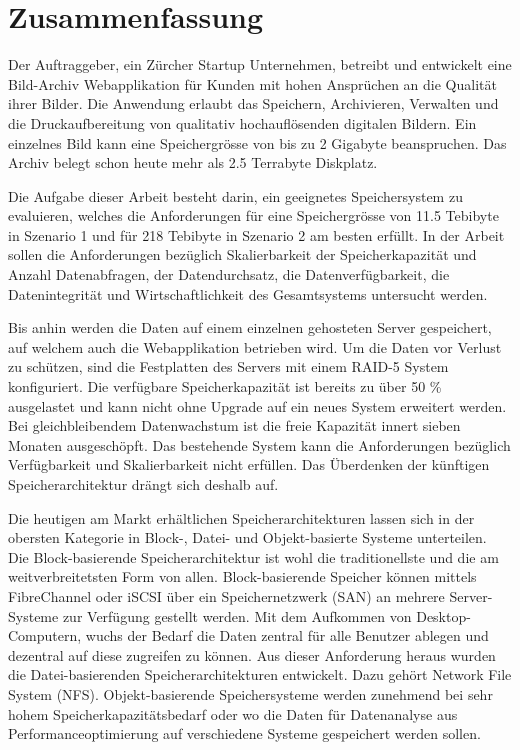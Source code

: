 \cleardoublepage
\chapter{Zusammenfassung}

Der Auftraggeber, ein Zürcher Startup Unternehmen, betreibt und entwickelt eine Bild-Archiv Webapplikation für Kunden mit hohen Ansprüchen an die Qualität ihrer Bilder. Die Anwendung erlaubt das Speichern, Archivieren, Verwalten und die Druckaufbereitung von qualitativ hochauflösenden digitalen Bildern. Ein einzelnes Bild kann eine Speichergrösse von bis zu 2 Gigabyte beanspruchen. Das Archiv belegt schon heute mehr als 2.5 Terrabyte Diskplatz.

Die Aufgabe dieser Arbeit besteht darin, ein geeignetes Speichersystem zu evaluieren, welches die Anforderungen für eine Speichergrösse von 11.5 Tebibyte in Szenario 1 und für 218 Tebibyte in Szenario 2 am besten erfüllt. In der Arbeit sollen die Anforderungen bezüglich Skalierbarkeit der Speicherkapazität und Anzahl Datenabfragen, der Datendurchsatz, die Datenverfügbarkeit, die Datenintegrität und Wirtschaftlichkeit des Gesamtsystems untersucht werden.

Bis anhin werden die Daten auf einem einzelnen gehosteten Server gespeichert, auf welchem auch die Webapplikation betrieben wird. Um die Daten vor Verlust zu schützen, sind die Festplatten des Servers mit einem RAID-5 System konfiguriert. Die verfügbare Speicherkapazität ist bereits zu über 50 \% ausgelastet und kann nicht ohne Upgrade auf ein neues System erweitert werden. Bei gleichbleibendem Datenwachstum ist die freie Kapazität innert sieben Monaten ausgeschöpft. Das bestehende System kann die Anforderungen bezüglich Verfügbarkeit und Skalierbarkeit nicht erfüllen. Das Überdenken der künftigen Speicherarchitektur drängt sich deshalb auf.
 
Die heutigen am Markt erhältlichen Speicherarchitekturen lassen sich in der obersten Kategorie in Block-, Datei- und Objekt-basierte Systeme unterteilen. Die Block-basierende Speicherarchitektur ist wohl die traditionellste und die am weitverbreitetsten Form von allen. Block-basierende Speicher können mittels FibreChannel oder iSCSI über ein Speichernetzwerk (SAN) an mehrere Server-Systeme zur Verfügung gestellt werden. Mit dem Aufkommen von Desktop-Computern, wuchs der Bedarf die Daten zentral für alle Benutzer ablegen und dezentral auf diese zugreifen zu können. Aus dieser Anforderung heraus wurden die Datei-basierenden Speicherarchitekturen entwickelt. Dazu gehört Network File System (NFS). Objekt-basierende Speichersysteme werden zunehmend bei sehr hohem Speicherkapazitätsbedarf oder wo die Daten für Datenanalyse aus Performanceoptimierung auf verschiedene Systeme gespeichert werden sollen.


